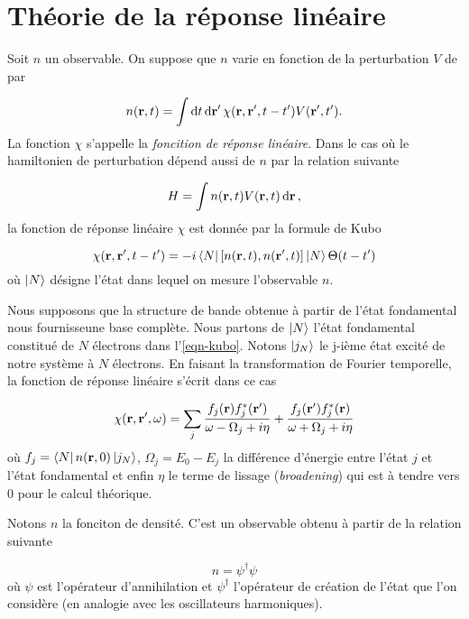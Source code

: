 \chapter{Théorie de la réponse linéaire}\label{chap-TRL}
Soit $n$ un observable. On suppose que $n$ varie en fonction de la perturbation $V$ de par

\begin{equation*}
  n(\vb{r}, t) = \int \dd{t} \dd{\vb{r}'}  \chi (\vb{r}, \vb{r}', t-t') V(\vb{r}', t').
\end{equation*}
La fonction $\chi$ s'appelle la \textit{foncition de réponse linéaire}.
Dans le cas où le hamiltonien de perturbation dépend aussi de $n$ par la relation suivante

\begin{equation*}
  H = \int n(\vb{r}, t) V(\vb{r}, t) \dd{\vb{r}},
\end{equation*}
la fonction de réponse linéaire $\chi$ est donnée par la formule de Kubo~\cite{Abrikosov1963}

\begin{equation}\label{eqn-kubo}
  \chi (\vb{r}, \vb{r}', t-t') = -i \bra{N} \comm{n(\vb{r}, t)}{n(\vb{r}', t)} \ket{N} \Theta(t-t')
\end{equation}
où $\ket{N}$ désigne l'état dans lequel on mesure l'observable $n$.

Nous supposons que la structure de bande obtenue
à partir de l'état fondamental nous fournisseune base complète.
Nous partons de $\ket{N}$ l'état fondamental constitué de $N$ électrons dans l'\cref{eqn-kubo}.
Notons $\ket{j_N}$ le j-ième état excité de notre système à $N$ électrons.
En faisant la transformation de Fourier temporelle,
la fonction de réponse linéaire s'écrit dans ce cas

\begin{equation}
 \chi (\vb{r}, \vb{r}', \omega) = \sum_j \frac{f_j(\vb{r}) f_j^*(\vb{r}') }{\omega - \Omega_j + i \eta} + \frac{f_j(\vb{r}') f_j^*(\vb{r}) }{\omega + \Omega_j + i \eta}
\end{equation}
où $f_j = \bra{N}n(\vb{r}, 0)\ket{j_N}$, $\Omega_j = E_0 - E_j$ la différence d'énergie
entre l'état $j$ et l'état fondamental et enfin $\eta$ le terme de lissage (\textit{broadening})
qui est à tendre vers 0 pour le calcul théorique.

Notons $n$ la fonciton de densité. C'est un observable obtenu à partir de la relation suivante

\begin{equation*}
n = \psi^\dagger \psi
\end{equation*}
où $\psi$ est l'opérateur d'annihilation et $\psi^\dagger$ l'opérateur de création de l'état
que l'on considère (en analogie avec les oscillateurs harmoniques).

